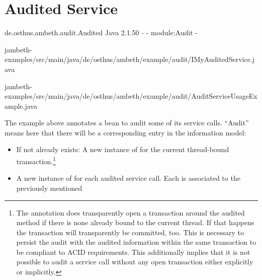 \section{Audited Service}
\label{feature:AuditedService}
\ClearAPI
\TODO
\feature
	{de.osthus.ambeth.audit.Audited}
	{Java}
	{2.1.50}
	{-}
	{-}
	{module:Audit}
	{-}
	
	{jambeth-examples/src/main/java/de/osthus/ambeth/example/audit/IMyAuditedService.java}

	{jambeth-examples/src/main/java/de/osthus/ambeth/example/audit/AuditServiceUsageExample.java}

The example above annotates a bean to audit some of its service calls. ``Audit'' means here that there will be a corresponding entry in the information model:

\begin{itemize}
	\item If not already exists: A new instance of  for the current thread-bound transaction.\footnote{The \type{\@Audited} annotation does transparently open a transaction around the audited method if there is none already bound to the current thread. If that happens the transaction will transparently be committed, too. This is necessary to persist the audit with the audited information within the same transaction to be compliant to ACID requirements. This additionally implies that it is not possible to audit a service call without any open transaction either explicitly or implicitly.}
	\item A new instance of  for each audited service call. Each  is associated to the previously mentioned 
\end{itemize}

